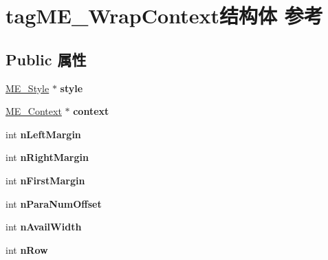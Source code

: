 \hypertarget{structtag_m_e___wrap_context}{}\section{tag\+M\+E\+\_\+\+Wrap\+Context结构体 参考}
\label{structtag_m_e___wrap_context}
\subsection*{Public 属性}
\begin{DoxyCompactItemize}
\item 
\mbox{\label{structtag_m_e___wrap_context_a43924fd287ed03d6ba8c546c2c2707a5}} 
\hyperlink{structtag_m_e___style}{M\+E\+\_\+\+Style} $\ast$ {\bfseries style}
\item 
\mbox{\label{structtag_m_e___wrap_context_acdd2cef19e2c00e4e325218fc8cee835}} 
\hyperlink{structtag_m_e___context}{M\+E\+\_\+\+Context} $\ast$ {\bfseries context}
\item 
\mbox{\label{structtag_m_e___wrap_context_a11fb00f93df67c7b24b52db4b6c4cde7}} 
int {\bfseries n\+Left\+Margin}
\item 
\mbox{\label{structtag_m_e___wrap_context_a1d428dff83f19e39cf8f415abdf4f70b}} 
int {\bfseries n\+Right\+Margin}
\item 
\mbox{\label{structtag_m_e___wrap_context_a359003d09840c48a4fdc67bf80358660}} 
int {\bfseries n\+First\+Margin}
\item 
\mbox{\label{structtag_m_e___wrap_context_a987b0d2f7ce3a959129bfd6ca201cdc5}} 
int {\bfseries n\+Para\+Num\+Offset}
\item 
\mbox{\label{structtag_m_e___wrap_context_a19eec1d1d6bc086b9fb49041472680e6}} 
int {\bfseries n\+Avail\+Width}
\item 
\mbox{\label{structtag_m_e___wrap_context_aacfb4d03285e64e397b6e8fe93b66dda}} 
int {\bfseries n\+Row}
\item 

\end{DoxyCompactItemize}
